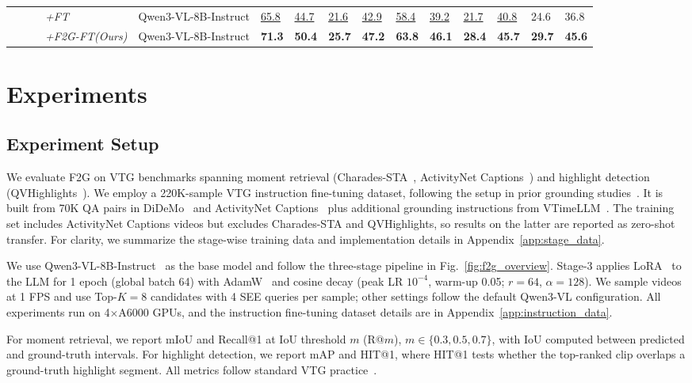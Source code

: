 \documentclass{article}
\theoremstyle{plain}
\theoremstyle{definition}
\theoremstyle{remark}
\begin{document}
\begin{table}[t]
{\begin{tabular}{l|l|llll|llll|ll}
~~~~~~\textit{+FT} & Qwen3-VL-8B-Instruct & \underline{65.8} & \underline{44.7} & \underline{21.6} & \underline{42.9} & \underline{58.4} & \underline{39.2} & \underline{21.7} & \underline{40.8} & 24.6 & 36.8\\
~~~~~~\textit{+F2G-FT(Ours)} & Qwen3-VL-8B-Instruct & \textbf{71.3} & \textbf{50.4} & \textbf{25.7} & \textbf{47.2} & \textbf{63.8} & \textbf{46.1} & \textbf{28.4} & \textbf{45.7} & \textbf{29.7} & \textbf{45.6}\\
\bottomrule
\end{tabular}}
\vskip -0.1in
\label{table:main}
\end{table}

\section{Experiments}

\subsection{Experiment Setup}
We evaluate F2G on VTG benchmarks spanning moment retrieval (Charades-STA~\cite{Charades-STA}, ActivityNet Captions~\cite{activitynet_captions}) and highlight detection (QVHighlights~\cite{qvhighlights}). We employ a 220K-sample VTG instruction fine-tuning dataset, following the setup in prior grounding studies~\cite{VTimeLLM,NumPro}.
It is built from 70K QA pairs in DiDeMo~\cite{DiDeMo} and ActivityNet Captions~\cite{activitynet_captions} plus additional grounding instructions from VTimeLLM~\cite{VTimeLLM}. 
The training set includes ActivityNet Captions videos but excludes Charades-STA and QVHighlights, so results on the latter are reported as zero-shot transfer. For clarity, we summarize the stage-wise training data and implementation details in Appendix~\ref{app:stage_data}.

We use Qwen3-VL-8B-Instruct~\cite{Qwen3-VL} as the base model and follow the three-stage pipeline in Fig.~\ref{fig:f2g_overview}. Stage-3 applies LoRA~\cite{LoRA} to the LLM for 1 epoch (global batch 64) with AdamW~\cite{Adam} and cosine decay (peak LR $10^{-4}$, warm-up 0.05; $r{=}64$, $\alpha{=}128$). 
We sample videos at 1 FPS and use Top-$K{=}8$ candidates with 4 SEE queries per sample; other settings follow the default Qwen3-VL configuration. 
All experiments run on 4$\times$A6000 GPUs, and the instruction fine-tuning dataset details are in Appendix~\ref{app:instruction_data}.

For moment retrieval, we report mIoU and Recall@1 at IoU threshold $m$ (R@$m$), $m\in\{0.3,0.5,0.7\}$, with IoU computed between predicted and ground-truth intervals. 
For highlight detection, we report mAP and HIT@1, where HIT@1 tests whether the top-ranked clip overlaps a ground-truth highlight segment. 
All metrics follow standard VTG practice~\cite{VTimeLLM,Momentor,TimeChat,Hawkeye,VTG-llm}.
\end{document}

